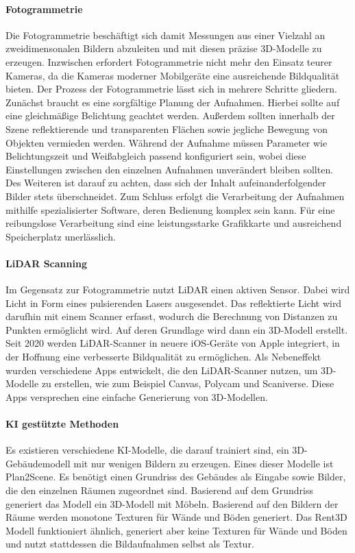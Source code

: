 \paragraph{Fotogrammetrie}

Die Fotogrammetrie beschäftigt sich damit Messungen aus einer Vielzahl an zweidimensonalen Bildern abzuleiten und mit diesen präzise 3D-Modelle zu erzeugen\cite[S.~19]{Aber2010}. Inzwischen erfordert Fotogrammetrie nicht mehr den Einsatz teurer Kameras, da die Kameras moderner Mobilgeräte eine ausreichende Bildqualität bieten\cite{Cohrs2021}. Der Prozess der Fotogrammetrie lässt sich in mehrere Schritte gliedern. Zunächst braucht es eine sorgfältige Planung der Aufnahmen. Hierbei sollte auf eine gleichmäßige Belichtung geachtet werden. Außerdem sollten innerhalb der Szene reflektierende und transparenten Flächen sowie jegliche Bewegung von Objekten vermieden werden. Während der Aufnahme müssen Parameter wie Belichtungszeit und Weißabgleich passend konfiguriert sein, wobei diese Einstellungen zwischen den einzelnen Aufnahmen unverändert bleiben sollten. Des Weiteren ist darauf zu achten, dass sich der Inhalt aufeinanderfolgender Bilder stets überschneidet.\cite{Cohrs2021b} Zum Schluss erfolgt die Verarbeitung der Aufnahmen mithilfe spezialisierter Software, deren Bedienung komplex sein kann. Für eine reibungslose Verarbeitung sind eine leistungsstarke Grafikkarte und ausreichend Speicherplatz unerlässlich.\cite{Cohrs2021c}

\paragraph{LiDAR Scanning}
Im Gegensatz zur Fotogrammetrie nutzt \ac{LiDAR} einen aktiven Sensor. Dabei wird Licht in Form eines pulsierenden Lasers ausgesendet. Das reflektierte Licht wird darufhin mit einem Scanner erfasst, wodurch die Berechnung von Distanzen zu Punkten ermöglicht wird. Auf deren Grundlage wird dann ein 3D-Modell erstellt. Seit 2020 werden LiDAR-Scanner in neuere iOS-Geräte von Apple integriert, in der Hoffnung eine verbesserte Bildqualität zu ermöglichen\cite{Fenstermaker2022}. Als Nebeneffekt wurden verschiedene Apps entwickelt, die den LiDAR-Scanner nutzen, um 3D-Modelle zu erstellen, wie zum Beispiel Canvas\cite{Canvas2023}, Polycam\cite{Polycam2024} und Scaniverse\cite{Scaniverse2024}. Diese Apps versprechen eine einfache Generierung von 3D-Modellen.

\paragraph{KI gestützte Methoden}
Es existieren verschiedene KI-Modelle, die darauf trainiert sind, ein 3D-Gebäudemodell mit nur wenigen Bildern zu erzeugen. Eines dieser Modelle ist Plan2Scene. Es benötigt einen Grundriss des Gebäudes als Eingabe sowie Bilder, die den einzelnen Räumen zugeordnet sind. Basierend auf dem Grundriss generiert das Modell ein 3D-Modell mit Möbeln. Basierend auf den Bildern der Räume werden monotone Texturen für Wände und Böden generiert.\cite[S.~10733]{Plan2Scene2021} Das Rent3D Modell funktioniert ähnlich, generiert aber keine Texturen für Wände und Böden und nutzt stattdessen die Bildaufnahmen selbst als Textur\cite[S.~3413]{Rent3D2015}.

